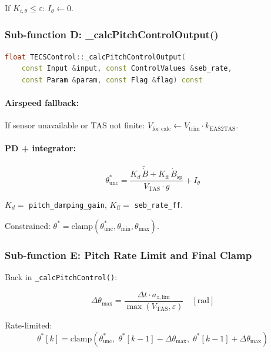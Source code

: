 \documentclass[12pt,a4paper]{article}
\begin{document}
If $K_{i,\theta} \leq \varepsilon$: $I_\theta \leftarrow 0$.

\subsubsection{Sub-function D: \_calcPitchControlOutput()}

\begin{lstlisting}[language=C++]
float TECSControl::_calcPitchControlOutput(
    const Input &input, const ControlValues &seb_rate,
    const Param &param, const Flag &flag) const
\end{lstlisting}

\paragraph{Airspeed fallback:}
If sensor unavailable or TAS not finite:
$V_{\text{for calc}} \leftarrow V_{\text{trim}} \cdot k_{\text{EAS2TAS}}$.

\paragraph{PD + integrator:}
\begin{equation}
  \theta^*_{\text{unc}} =
    \frac{K_d\,\tilde{\dot{B}} + K_{\text{ff}}\,\dot{B}_{\text{sp}}}{V_{\text{TAS}} \cdot g}
    + I_\theta
\end{equation}

$K_d = $ \texttt{pitch\_damping\_gain},
$K_{\text{ff}} = $ \texttt{seb\_rate\_ff}.

Constrained: $\theta^* = \text{clamp}(\theta^*_{\text{unc}}, \theta_{\min}, \theta_{\max})$.

\subsubsection{Sub-function E: Pitch Rate Limit and Final Clamp}

Back in \texttt{\_calcPitchControl()}:

\begin{equation}
  \Delta\theta_{\max} = \frac{\Delta t \cdot a_{z,\text{lim}}}{\max(V_{\text{TAS}}, \varepsilon)}
  \quad [\text{rad}]
\end{equation}

Rate-limited:
\begin{equation}
  \theta^*[k] = \text{clamp}\!\left(\theta^*_{\text{unc}},\;
    \theta^*[k-1] - \Delta\theta_{\max},\;
    \theta^*[k-1] + \Delta\theta_{\max}\right)
\end{equation}
\end{document}
